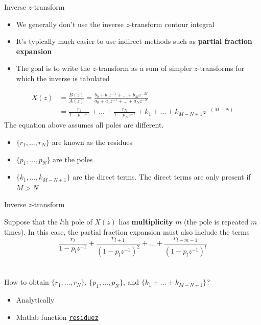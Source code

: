 \documentclass[10pt, handout]{beamer}
\begin{document}
%
\begin{frame}{Inverse $z$-transform}
\begin{itemize}
	\item We generally don't use the inverse $z$-transform contour integral
	\item It's typically much easier to use indirect methods such as \textbf{partial fraction expansion}
	\item The goal is to write the $z$-transform as a sum of simpler $z$-transforms for which the inverse is tabulated
\end{itemize}
\vspace{-0.25cm}
\begin{align*}
X(z) &= \frac{B(z)}{A(z)} = \frac{b_0 + b_1z^{-1}+\ldots+b_Mz^{-M}}{a_0 + a_1z^{-1}+\ldots+a_Nz^{-N}} \tag{$z$-transform we want to invert} \\
&= \frac{r_1}{1-p_1z^{-1}} + \ldots + \frac{r_N}{1-p_Nz^{-1}} + k_1 + \ldots + k_{M-N+1}z^{-(M-N)} \tag{sum of simpler $z$-transforms}
\end{align*}
The equation above assumes all poles are different.

\begin{itemize}
	\item $\{r_1,\ldots,r_N\}$ are known as the residues
	\item $\{p_1,\ldots,p_N\}$ are the poles
	\item $\{k_1, \ldots, k_{M-N+1}\}$ are the direct terms. The direct terms are only present if $M > N$
\end{itemize}

\end{frame}

%
\begin{frame}{Inverse $z$-transform}

Suppose that the $l$th pole of $X(z)$ has \textbf{multiplicity} $m$ (the pole is repeated $m$ times). In this case, the partial fraction expansion must also include the terms
~\\

\begin{equation*}
\frac{r_l}{1-p_lz^{-1}} + \frac{r_{l+1}}{(1-p_lz^{-1})^2} + \ldots + \frac{r_{l+m-1}}{(1-p_lz^{-1})^l}
\end{equation*}
~\\
~\\
How to obtain $\{r_1,\ldots,r_N\}$, $\{p_1,\ldots,p_N\}$, and $\{k_1 + \ldots + k_{M-N+1}\}$?
\begin{itemize}
	\item Analytically
	\item Matlab function \href{https://www.mathworks.com/help/signal/ref/residuez.html}{\texttt{residuez}}
\end{itemize}

\end{frame}
\end{document}
